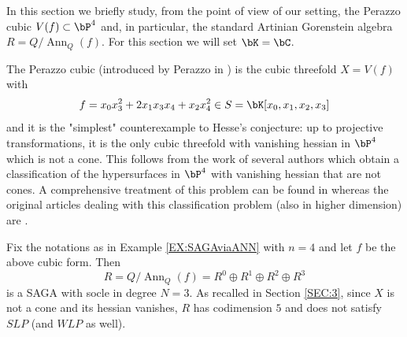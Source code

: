 \documentclass[a4paper,11pt]{amsart}
\DeclareMathOperator{\Ann}{Ann}
\begin{document}
In this section we briefly study, from the point of view of our setting, the Perazzo cubic $V(f)\subset \bP^4$ and, in particular, the standard Artinian Gorenstein algebra $R=Q/\Ann_Q(f)$. For this section we will set $\bK=\bC$.
\vspace{2mm}

The Perazzo cubic (introduced by Perazzo in \cite{Per}) is the cubic threefold $X=V(f)$ with 
$$f=x_0x_3^2+2x_1x_3x_4+x_2x_4^2\in S=\bK[x_0,x_1,x_2,x_3]$$
and it is the "simplest" counterexample to Hesse's conjecture: up to projective transformations, it is the only cubic threefold with vanishing hessian in $\bP^4$ which is not a cone. This follows from the work of several authors which obtain a classification of the hypersurfaces in $\bP^4$ with vanishing hessian that are not cones. A comprehensive treatment of this problem can be found in \cite[Chapter 7.4]{Rus16} whereas the original articles dealing with this classification problem (also in higher dimension) are \cite{GN,Per,Fra54,Per57,Per64,Los04,CRS08,GR09}. 
\vspace{2mm}

Fix the notations as in Example \ref{EX:SAGAviaANN} with $n=4$ and let $f$ be the above cubic form. Then
$$R=Q/\Ann_Q(f)=R^0\oplus R^1\oplus R^2\oplus R^3$$ 
is a SAGA with socle in degree $N=3$. As recalled in Section \ref{SEC:3}, since $X$ is not a cone and its hessian vanishes, $R$ has codimension $5$ and does not satisfy $SLP$ (and $WLP$ as well). 
\vspace{2mm}
\end{document}
